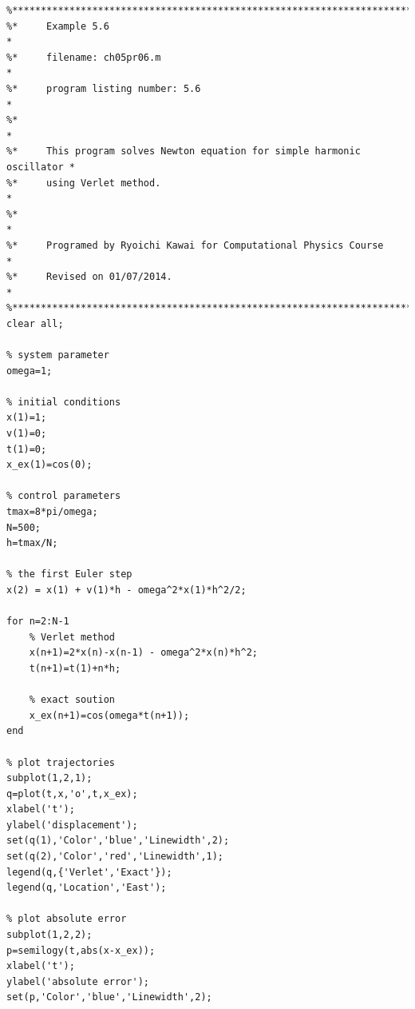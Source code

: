 \footnotesize
\begin{verbatim}
%**************************************************************************
%*     Example 5.6                                                        *
%*     filename: ch05pr06.m                                               *
%*     program listing number: 5.6                                        *
%*                                                                        *
%*     This program solves Newton equation for simple harmonic oscillator *
%*     using Verlet method.                                               *
%*                                                                        *
%*     Programed by Ryoichi Kawai for Computational Physics Course        *
%*     Revised on 01/07/2014.                                             *
%**************************************************************************
clear all;

% system parameter
omega=1;

% initial conditions
x(1)=1;
v(1)=0;
t(1)=0;
x_ex(1)=cos(0);

% control parameters
tmax=8*pi/omega;
N=500;
h=tmax/N;

% the first Euler step
x(2) = x(1) + v(1)*h - omega^2*x(1)*h^2/2;

for n=2:N-1
    % Verlet method
    x(n+1)=2*x(n)-x(n-1) - omega^2*x(n)*h^2;
    t(n+1)=t(1)+n*h;
   
    % exact soution
    x_ex(n+1)=cos(omega*t(n+1));
end

% plot trajectories
subplot(1,2,1);
q=plot(t,x,'o',t,x_ex);
xlabel('t');
ylabel('displacement');
set(q(1),'Color','blue','Linewidth',2);
set(q(2),'Color','red','Linewidth',1);
legend(q,{'Verlet','Exact'});
legend(q,'Location','East');

% plot absolute error
subplot(1,2,2);
p=semilogy(t,abs(x-x_ex));
xlabel('t');
ylabel('absolute error');
set(p,'Color','blue','Linewidth',2);
\end{verbatim}
\normalsize




\bigskip
\noindent
\program
\label{prog:brusselator}

